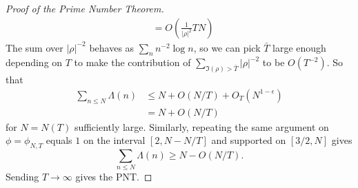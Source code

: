 \begin{proof}[Proof of the Prime Number Theorem]
\begin{align*}
    &=O\left(\frac{1}{|\rho|^2} TN\right)
\end{align*}
The sum over $|\rho|^{-2}$ behaves as $\sum_n n^{-2} \log n$, so we can pick $\bar{T}$ large enough depending on $T$
to make the contribution of $\sum_{\Im(\rho)>\bar{T}} |\rho|^{-2}$ to be $O(T^{-2})$.
So that 
\begin{align*}
    \sum_{n\leq N}\Lambda(n)&\leq N +O(N/T)+ O_T(N^{1-\epsilon})\\
   & = N+O(N/T)
\end{align*}
for $N=N(T)$ sufficiently large.
Similarly, repeating the same argument on $\phi=\phi_{N,T}$ equals $1$ on the interval $[2,N-N/T]$ and supported on $[3/2, N]$
gives \[
    \sum_{n\leq N}\Lambda(n)\geq N-O(N/T).
\]
Sending $T\to\infty$ gives the PNT.
\end{proof}
